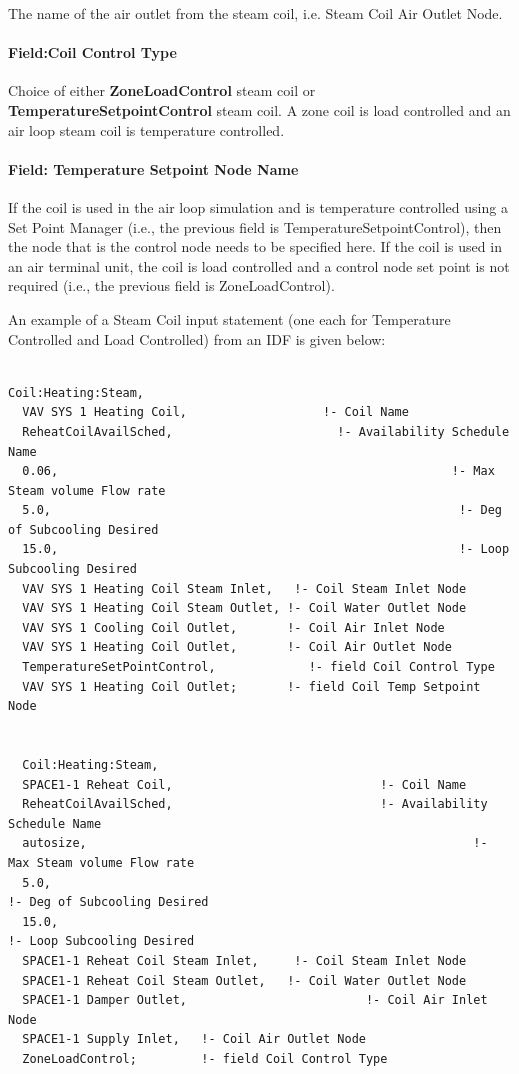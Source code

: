 The name of the air outlet from the steam coil, i.e. Steam Coil Air Outlet Node.

\paragraph{Field:Coil Control Type}\label{fieldcoil-control-type}

Choice of either \textbf{ZoneLoadControl} steam coil or \textbf{TemperatureSetpointControl} steam coil. A zone coil is load controlled and an air loop steam coil is temperature controlled.

\paragraph{Field: Temperature Setpoint Node Name}\label{field-temperature-setpoint-node-name}

If the coil is used in the air loop simulation and is temperature controlled using a Set Point Manager (i.e., the previous field is TemperatureSetpointControl), then the node that is the control node needs to be specified here. If the coil is used in an air terminal unit, the coil is load controlled and a control node set point is not required (i.e., the previous field is ZoneLoadControl).

An example of a Steam Coil input statement (one each for Temperature Controlled and Load Controlled) from an IDF is given below:

\begin{lstlisting}

Coil:Heating:Steam,
  VAV SYS 1 Heating Coil,                   !- Coil Name
  ReheatCoilAvailSched,                       !- Availability Schedule Name
  0.06,                                                       !- Max Steam volume Flow rate
  5.0,                                                         !- Deg of Subcooling Desired
  15.0,                                                        !- Loop Subcooling Desired
  VAV SYS 1 Heating Coil Steam Inlet,   !- Coil Steam Inlet Node
  VAV SYS 1 Heating Coil Steam Outlet, !- Coil Water Outlet Node
  VAV SYS 1 Cooling Coil Outlet,       !- Coil Air Inlet Node
  VAV SYS 1 Heating Coil Outlet,       !- Coil Air Outlet Node
  TemperatureSetPointControl,             !- field Coil Control Type
  VAV SYS 1 Heating Coil Outlet;       !- field Coil Temp Setpoint Node


  Coil:Heating:Steam,
  SPACE1-1 Reheat Coil,                             !- Coil Name
  ReheatCoilAvailSched,                             !- Availability Schedule Name
  autosize,                                                      !- Max Steam volume Flow rate
  5.0,                                                                !- Deg of Subcooling Desired
  15.0,                                                              !- Loop Subcooling Desired
  SPACE1-1 Reheat Coil Steam Inlet,     !- Coil Steam Inlet Node
  SPACE1-1 Reheat Coil Steam Outlet,   !- Coil Water Outlet Node
  SPACE1-1 Damper Outlet,                         !- Coil Air Inlet Node
  SPACE1-1 Supply Inlet,   !- Coil Air Outlet Node
  ZoneLoadControl;         !- field Coil Control Type
\end{lstlisting}

